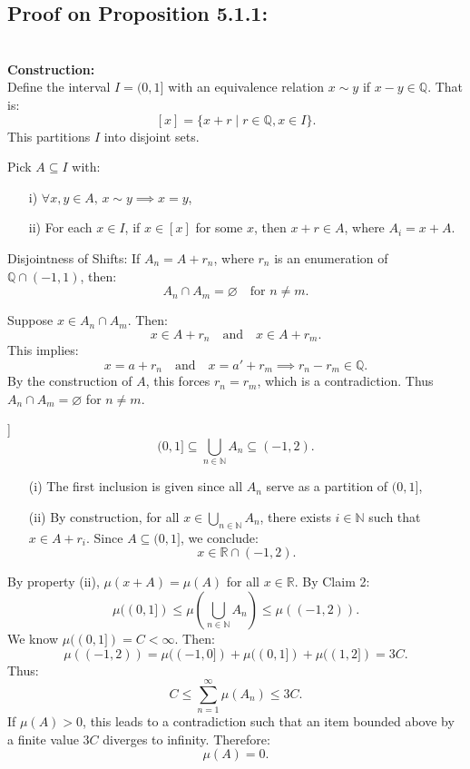 \subsection{Proof on Proposition 5.1.1:}
\label{proof:non-existence}
\begin{prf*}\\
\textbf{Construction:}\\
Define the interval \( I = (0, 1] \) with an equivalence relation \( x \sim y \) if \( x - y \in \mathbb{Q} \). That is:
\[
[x] = \{x + r \mid r \in \mathbb{Q}, x \in I\}.
\]
This partitions \( I \) into disjoint sets.

\noindent Pick \( A \subseteq I \) with:
\begin{enumerate}
    \item[i)] \(\forall x, y \in A, \, x \sim y \implies x = y\),
    \item[ii)] For each \( x \in I \), if \( x \in [x] \) for some \( x \), then \( x + r \in A \), where \( A_i = x + A \).
\end{enumerate}

\begin{clm}Disjointness of Shifts: If \( A_n = A + r_n \), where \( r_n \) is an enumeration of \( \mathbb{Q} \cap (-1, 1) \), then:
\[
A_n \cap A_m = \varnothing \quad \text{for } n \neq m.
\]
\end{clm}

\noindent Suppose \( x \in A_n \cap A_m \). Then:
\[
x \in A + r_n \quad \text{and} \quad x \in A + r_m.
\]
This implies:
\[
x = a + r_n \quad \text{and} \quad x = a' + r_m \implies r_n - r_m \in \mathbb{Q}.
\]
By the construction of \( A \), this forces \( r_n = r_m \), which is a contradiction. Thus \( A_n \cap A_m = \varnothing \) for \( n \neq m \).

\begin{clm}[Covering of \((0, 1]\)]
\[
(0, 1] \subseteq \bigcup_{n \in \mathbb{N}} A_n \subseteq (-1, 2).
\]
\end{clm}

\begin{enumerate}
    \item[(i)] The first inclusion is given since all \( A_n \) serve as a partition of \((0, 1]\),
    \item[(ii)] By construction, for all \( x \in \bigcup_{n \in \mathbb{N}} A_n \), there exists \( i \in \mathbb{N} \) such that \( x \in A + r_i \). Since \( A \subseteq (0, 1] \), we conclude:
    \[
    x \in \mathbb{R} \cap (-1, 2).
    \]
\end{enumerate}

By property (ii), \( \mu(x + A) = \mu(A) \) for all \( x \in \mathbb{R} \). By Claim 2:
\[
\mu((0, 1]) \leq \mu\left(\bigcup_{n \in \mathbb{N}} A_n\right) \leq \mu((-1, 2)).
\]
We know \(\mu((0, 1]) = C < \infty\). Then:
\[
\mu((-1, 2)) = \mu((-1, 0]) + \mu((0, 1]) + \mu((1, 2]) = 3C.
\]
Thus:
\[
C \leq \sum_{n=1}^\infty \mu(A_n) \leq 3C.
\]
If \( \mu(A) > 0 \), this leads to a contradiction such that an item bounded above by a finite value $3C$ diverges to infinity. Therefore:
\[
\mu(A) = 0.
\]

\end{prf*}

